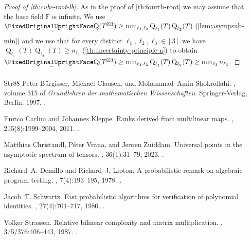 \documentclass[11pt]{article}
\makeatletter
\DeclareMathOperator{\subrank}{Q}
\newcommand{\FF}{\mathbb{F}}
\edef\FixedOriginalLowerTilde{\noexpand\mathchar\number\numexpr\symlargesymbols*256+101\relax}
\newcommand{\FixedQGlyphStyle}[2]{\begingroup\setbox0=\hbox{$\m@th#1\text{\normalfont\FixedOriginalUprightFace Q}$}\setbox2=\hbox{$\m@th#1\FixedOriginalLowerTilde$}\dimen0=\dp0\advance\dimen0 by\ht2\advance\dimen0 by1.23pt\typeout{FIXEDGLYPH Q STYLE\meaning#1 BASEwidth=\the\wd0 BASEheight=\the\ht0 BASEdepth=\the\dp0 TILDEwidth=\the\wd2 TILDEheight=\the\ht2 TILDEdepth=\the\dp2 LOWER=\the\dimen0}\hbox{\rlap{\hbox to\wd0{\hss\lower\dimen0\copy2\hss}}\box0}\endgroup}
\DeclareMathOperator{\asympsubrank}{\mathpalette\FixedQGlyphStyle\relax}
\makeatother
\begin{document}
\begin{proof}[Proof of \autoref{th:cube-root-lb}]
As in the proof of \autoref{th:fourth-root} we may assume that the base field $\FF$ is infinite.
%
%
%
We use $\asympsubrank(T^{\boxtimes 3}) \geq \min_{{\ell_1},{\ell_2}} \subrank_{\ell_1}(T) \subrank_{\ell_2}(T)$ (\autoref{lem:asympsub-min}) and we use that for every distinct ${\ell_1}, {\ell_2}, {\ell_3} \in [3]$ we have $\subrank_{\ell_1}(T)\subrank_{\ell_2}(T) \geq n_{\ell_3}$ (\autoref{th:uncertainty-principle-n}) to obtain
$\asympsubrank(T^{\boxtimes 3}) \geq \min_{{\ell_1},{\ell_2}} \subrank_{\ell_1}(T) \subrank_{\ell_2}(T) \geq \min_{\ell_3} n_{\ell_3}$. %
\end{proof}
\begin{thebibliography}{Str88}
Peter B\"{u}rgisser, Michael Clausen, and Mohammad~Amin Shokrollahi.
, volume 315 of {\em Grundlehren der mathematischen Wissenschaften}.
\newblock Springer-Verlag, Berlin, 1997.
\newblock \href {https://doi.org/10.1007/978-3-662-03338-8} {}.

Enrico Carlini and Johannes Kleppe.
\newblock Ranks derived from multilinear maps.
, 215(8):1999--2004, 2011.
\newblock \href {https://doi.org/10.1016/j.jpaa.2010.11.010} {}.

Matthias Christandl, P\'{e}ter Vrana, and Jeroen Zuiddam.
\newblock Universal points in the asymptotic spectrum of tensors.
, 36(1):31--79, 2023.
\newblock \href {https://doi.org/10.1090/jams/996} {}.

Richard~A. Demillo and Richard~J. Lipton.
\newblock A probabilistic remark on algebraic program testing.
, 7(4):193--195, 1978.
\newblock \href {https://doi.org/10.1016/0020-0190(78)90067-4} {}.

Jacob~T. Schwartz.
\newblock Fast probabilistic algorithms for verification of polynomial identities.
, 27(4):701--717, 1980.
\newblock \href {https://doi.org/10.1145/322217.322225} {}.

Volker Strassen.
\newblock Relative bilinear complexity and matrix multiplication.
, 375/376:406--443, 1987.
\newblock \href {https://doi.org/10.1515/crll.1987.375-376.406} {}.


\end{thebibliography}
\end{document}
